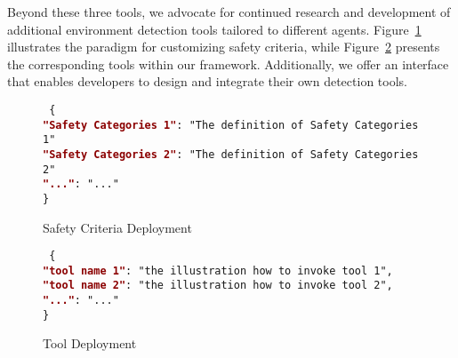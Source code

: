 Beyond these three tools, we advocate for continued research and development of additional environment detection tools tailored to different agents. Figure~\ref{app:method:safety_criteria} illustrates the paradigm for customizing safety criteria, while Figure~\ref{app:method:fig:tool_invocation} presents the corresponding tools within our framework. Additionally, we offer an interface that enables developers to design and integrate their own detection tools.
\begin{figure}[ht]
    \centering
    \begin{tcolorbox}[
        title=\texttt{Safety Criteria},
        width=0.47\textwidth %
    ]
    \begin{flushleft}
    \small
    \texttt{
    \{\\
    \textcolor{darkred}{\textbf{"Safety Categories 1"}}: "The definition of Safety Categories 1"\\
    \textcolor{darkred}{\textbf{"Safety Categories 2"}}: "The definition of Safety Categories 2"\\
    \textcolor{darkred}{\textbf{"..."}}: "..."
    \\\}
    }
    \end{flushleft}
    \end{tcolorbox}
    \caption{Safety Criteria Deployment}
    \label{app:method:safety_criteria}
\end{figure}

\begin{figure}[ht]
    \centering
    \begin{tcolorbox}[
        title=\texttt{Tool Invocation Instructions},
        width=0.47\textwidth %
    ]
    \begin{flushleft}
    \small
    \texttt{
    \{\\
    \textcolor{darkred}{\textbf{"tool name 1"}}: "the illustration how to invoke tool 1",\\
    \textcolor{darkred}{\textbf{"tool name 2"}}: "the illustration how to invoke tool 2",\\
    \textcolor{darkred}{\textbf{"..."}}: "..."\\
    \}
    }
    \end{flushleft}
    \end{tcolorbox}
    \caption{Tool Deployment}
    \label{app:method:fig:tool_invocation}
\end{figure}





